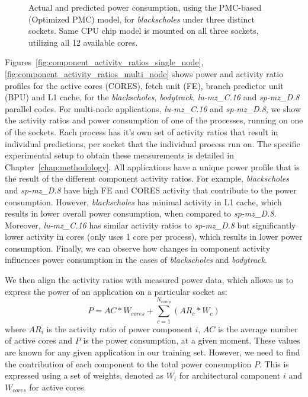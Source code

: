 \begin{figure}[p]
	\caption{Actual and predicted power consumption, using the PMC-based (Optimized PMC) model, for \textit{blackscholes} under three distinct sockets. Same CPU chip model is mounted on all three sockets, utilizing all 12 available cores.}
	\label{fig:prediction_eval}
	\vspace{.5cm}
\end{figure}




Figures~\ref{fig:component_activity_ratios_single_node},\ref{fig:component_activity_ratios_multi_node} shows power and activity ratio profiles for the active cores (CORES), fetch unit (FE), branch predictor unit (BPU) and L1 cache, for the \textit{blackscholes}, \textit{bodytrack}, \textit{lu-mz\_C.16} and \textit{sp-mz\_D.8} parallel codes. 
For multi-node applications, \textit{lu-mz\_C.16} and \textit{sp-mz\_D.8}, we show the activity ratios and power consumption of one of the processes, running on one of the sockets.  
Each process has it's own set of activity ratios that result in individual predictions, per socket that the individual process run on.
The specific experimental setup to obtain these measurements is detailed in Chapter~\ref{chap:methodology}. 
All applications have a unique power profile that is the result of the different component activity ratios.  
For example, \textit{blackscholes} and \textit{sp-mz\_D.8} have high FE and CORES activity that contribute to the power consumption.
However, \textit{blackscholes} has minimal activity in L1 cache, which results in lower overall power consumption, when compared to \textit{sp-mz\_D.8}.
Moreover, \textit{lu-mz\_C.16} has similar activity ratios to \textit{sp-mz\_D.8} but significantly lower activity in cores (only uses 1 core per process), which
results in lower power consumption.  Finally, we can observe how changes in component activity influences power consumption in the cases of \textit{blackscholes}
and \textit{bodytrack}.

We then align the activity ratios with measured power data, which allows us to express
the power of an application on a particular socket as: 
\begin{equation}
\label{eq:model_formula}
P = AC * W_{cores} + \sum_{c=1}^{N_{comp}} ( AR_c * W_c )
\end{equation}
where $AR_i$ is the activity ratio of power component $i$, $AC$ is the average number of active cores and $P$ is the power consumption, at a given moment. 
These values are known for any given application in our training set.  
However, we need to find the contribution of each component to the total power consumption $P$.  
This is expressed using a set of weights, denoted as $W_i$ for architectural component $i$ and $W_{cores}$ for active cores.

